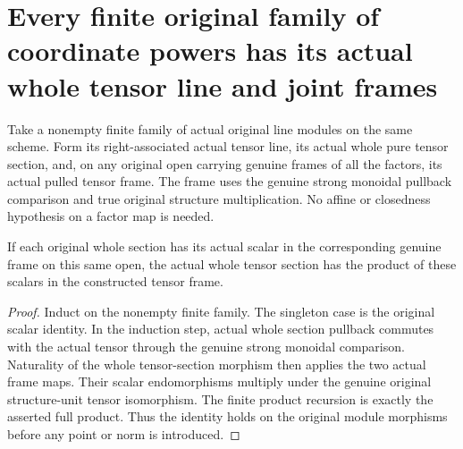 \section{Every finite original family of coordinate powers has its actual whole tensor line and joint frames}
\begin{definition}\label{def:finite-original-projective-power-line-frame}
\leanok
{}
Take a nonempty finite family of actual original line modules on the same scheme. Form its right-associated actual tensor line, its actual whole pure tensor section, and, on any original open carrying genuine frames of all the factors, its actual pulled tensor frame. The frame uses the genuine strong monoidal pullback comparison and true original structure multiplication. No affine or closedness hypothesis on a factor map is needed.
\end{definition}
\begin{theorem}\label{thm:finite-original-projective-power-tensor-scalar}
\leanok
{}
If each original whole section has its actual scalar in the corresponding genuine frame on this same open, the actual whole tensor section has the product of these scalars in the constructed tensor frame.
\end{theorem}
\begin{proof}
Induct on the nonempty finite family. The singleton case is the original scalar identity. In the induction step, actual whole section pullback commutes with the actual tensor through the genuine strong monoidal comparison. Naturality of the whole tensor-section morphism then applies the two actual frame maps. Their scalar endomorphisms multiply under the genuine original structure-unit tensor isomorphism. The finite product recursion is exactly the asserted full product. Thus the identity holds on the original module morphisms before any point or norm is introduced.
\end{proof}
